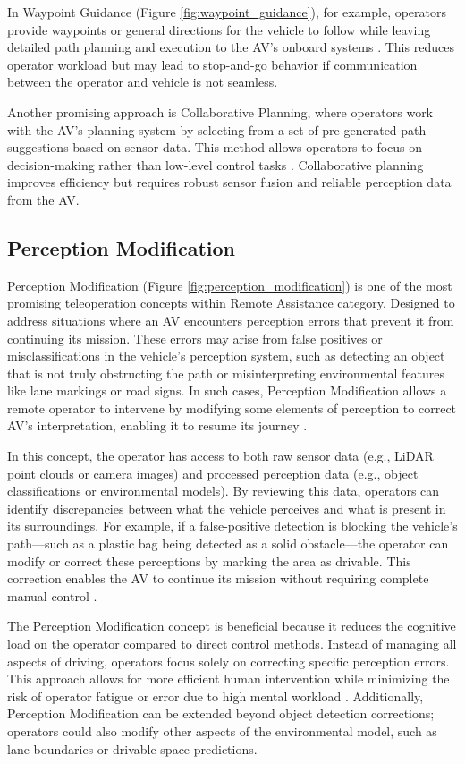 In Waypoint Guidance (Figure \ref{fig:waypoint_guidance}), for example, operators provide waypoints or general
directions for the vehicle to follow while leaving detailed path planning
and execution to the AV's onboard systems \cite{corridor}. This reduces
operator workload but may lead to stop-and-go behavior if communication
between the operator and vehicle is not seamless.

Another promising approach is Collaborative Planning, where operators
work with the AV's planning system by selecting from a set of pre-generated
path suggestions based on sensor data. This method allows operators to focus
on decision-making rather than low-level control tasks \cite{hosseini2024collaborative}.
Collaborative planning improves efficiency but requires robust sensor fusion and reliable
perception data from the AV.
\subsection{Perception Modification}

Perception Modification (Figure \ref{fig:perception_modification}) is one of the most promising teleoperation
concepts within Remote Assistance category. Designed to address situations where an \ac{AV}
encounters perception errors that prevent it
from continuing its mission. These errors may arise from false
positives or misclassifications in the vehicle's perception system,
such as detecting an object that is not truly obstructing the path or
misinterpreting environmental features like lane markings or road signs.
In such cases, Perception Modification allows a remote operator to
intervene by modifying some elements of perception to correct \ac{AV}'s interpretation,
enabling it to resume its journey \cite{Feiler2021ThePM}.

In this concept, the operator has access to both raw sensor data
(e.g., \ac{LiDAR} point clouds or camera images) and processed perception
data (e.g., object classifications or environmental models).
By reviewing this data, operators can identify discrepancies
between what the vehicle perceives and what is present in its
surroundings. For example, if a false-positive detection is blocking
the vehicle's path—such as a plastic bag being detected as a solid
obstacle—the operator can modify or correct these perceptions by
marking the area as drivable. This correction enables the AV to
continue its mission without requiring complete manual control \cite{Feiler2021ThePM}.

The Perception Modification concept is beneficial because
it reduces the cognitive load on the operator compared to direct control methods.
Instead of managing all aspects of driving, operators focus solely on correcting
specific perception errors. This approach allows for more efficient human
intervention while minimizing the risk of operator fatigue or error due to
high mental workload \cite{Brecht}. Additionally, Perception Modification can
be extended beyond object detection corrections; operators could also modify other
aspects of the environmental model, such as lane boundaries or drivable space predictions.

